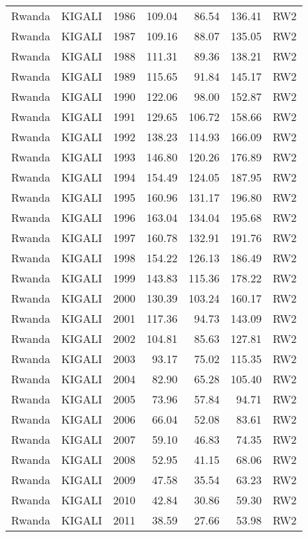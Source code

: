 \begin{longtable}{lllrrrl}
  Rwanda & KIGALI & 1986 & 109.04 & 86.54 & 136.41 & RW2 \\ 
  Rwanda & KIGALI & 1987 & 109.16 & 88.07 & 135.05 & RW2 \\ 
  Rwanda & KIGALI & 1988 & 111.31 & 89.36 & 138.21 & RW2 \\ 
  Rwanda & KIGALI & 1989 & 115.65 & 91.84 & 145.17 & RW2 \\ 
  Rwanda & KIGALI & 1990 & 122.06 & 98.00 & 152.87 & RW2 \\ 
  Rwanda & KIGALI & 1991 & 129.65 & 106.72 & 158.66 & RW2 \\ 
  Rwanda & KIGALI & 1992 & 138.23 & 114.93 & 166.09 & RW2 \\ 
  Rwanda & KIGALI & 1993 & 146.80 & 120.26 & 176.89 & RW2 \\ 
  Rwanda & KIGALI & 1994 & 154.49 & 124.05 & 187.95 & RW2 \\ 
  Rwanda & KIGALI & 1995 & 160.96 & 131.17 & 196.80 & RW2 \\ 
  Rwanda & KIGALI & 1996 & 163.04 & 134.04 & 195.68 & RW2 \\ 
  Rwanda & KIGALI & 1997 & 160.78 & 132.91 & 191.76 & RW2 \\ 
  Rwanda & KIGALI & 1998 & 154.22 & 126.13 & 186.49 & RW2 \\ 
  Rwanda & KIGALI & 1999 & 143.83 & 115.36 & 178.22 & RW2 \\ 
  Rwanda & KIGALI & 2000 & 130.39 & 103.24 & 160.17 & RW2 \\ 
  Rwanda & KIGALI & 2001 & 117.36 & 94.73 & 143.09 & RW2 \\ 
  Rwanda & KIGALI & 2002 & 104.81 & 85.63 & 127.81 & RW2 \\ 
  Rwanda & KIGALI & 2003 & 93.17 & 75.02 & 115.35 & RW2 \\ 
  Rwanda & KIGALI & 2004 & 82.90 & 65.28 & 105.40 & RW2 \\ 
  Rwanda & KIGALI & 2005 & 73.96 & 57.84 & 94.71 & RW2 \\ 
  Rwanda & KIGALI & 2006 & 66.04 & 52.08 & 83.61 & RW2 \\ 
  Rwanda & KIGALI & 2007 & 59.10 & 46.83 & 74.35 & RW2 \\ 
  Rwanda & KIGALI & 2008 & 52.95 & 41.15 & 68.06 & RW2 \\ 
  Rwanda & KIGALI & 2009 & 47.58 & 35.54 & 63.23 & RW2 \\ 
  Rwanda & KIGALI & 2010 & 42.84 & 30.86 & 59.30 & RW2 \\ 
  Rwanda & KIGALI & 2011 & 38.59 & 27.66 & 53.98 & RW2 \\ 

\end{longtable}
